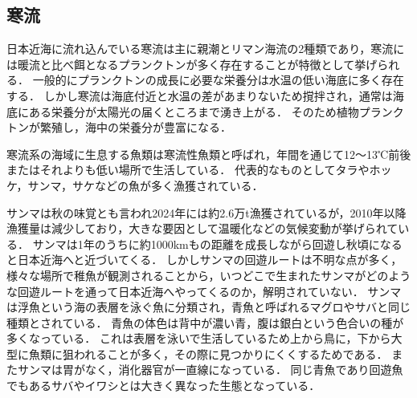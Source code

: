 \documentclass[12pt,a4j,titlepage]{ltjsarticle}
\begin{document}
\subsection{寒流}
日本近海に流れ込んでいる寒流は主に親潮とリマン海流の2種類であり，寒流には暖流と比べ餌となるプランクトンが多く存在することが特徴として挙げられる\cite{kairyuu}．
一般的にプランクトンの成長に必要な栄養分は水温の低い海底に多く存在する．
しかし寒流は海底付近と水温の差があまりないため撹拌され，通常は海底にある栄養分が太陽光の届くところまで湧き上がる．
そのため植物プランクトンが繁殖し，海中の栄養分が豊富になる．\par
寒流系の海域に生息する魚類は寒流性魚類と呼ばれ，年間を通じて12〜13℃前後またはそれよりも低い場所で生活している．
代表的なものとしてタラやホッケ，サンマ，サケなどの魚が多く漁獲されている．\par
サンマは秋の味覚とも言われ2024年には約2.6万t漁獲されているが，2010年以降漁獲量は減少しており，大きな要因として温暖化などの気候変動が挙げられている\cite{huryou}．
サンマは1年のうちに約1000kmもの距離を成長しながら回遊し秋頃になると日本近海へと近づいてくる．
しかしサンマの回遊ルートは不明な点が多く，様々な場所で稚魚が観測されることから，いつどこで生まれたサンマがどのような回遊ルートを通って日本近海へやってくるのか，解明されていない．
サンマは浮魚という海の表層を泳ぐ魚に分類され，青魚と呼ばれるマグロやサバと同じ種類とされている．
青魚の体色は背中が濃い青，腹は銀白という色合いの種が多くなっている．
これは表層を泳いで生活しているため上から鳥に，下から大型に魚類に狙われることが多く，その際に見つかりにくくするためである\cite{iro}．
またサンマは胃がなく，消化器官が一直線になっている．
同じ青魚であり回遊魚でもあるサバやイワシとは大きく異なった生態となっている．
\end{document}
